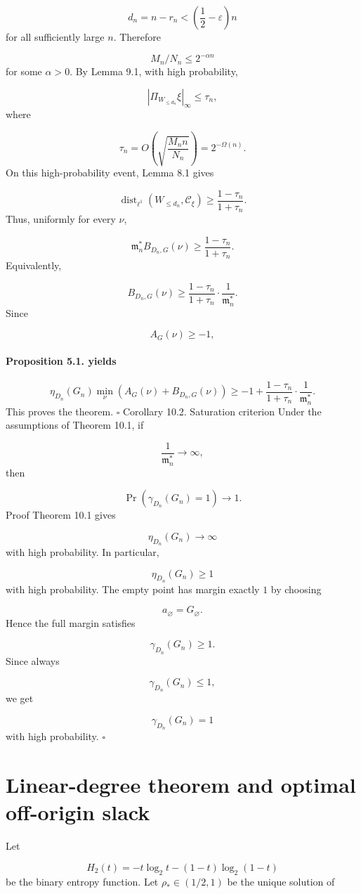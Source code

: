 \documentclass[11pt]{article}
\theoremstyle{definition}
\begin{document}
\[
d_n=n-r_n<
\left(\frac12-\varepsilon\right)n
\]
for all sufficiently large $n$. Therefore

\[
M_n/N_n\le2^{-\alpha n}
\]
for some $\alpha>0$. By Lemma 9.1, with high probability,

\[
|\Pi_{W_{\le d_n}}\xi|_\infty\le\tau_n,
\]
where

\[
\tau_n=O\left(\sqrt{\frac{M_nn}{N_n}}\right)=2^{-\Omega(n)}.
\]
On this high-probability event, Lemma 8.1 gives

\[
\operatorname{dist}_{\ell^1}(W_{\le d_n},\mathcal C_\xi)
\ge
\frac{1-\tau_n}{1+\tau_n}.
\]
Thus, uniformly for every $\nu$,

\[
\mathfrak m_n^*B_{D_n,G}(\nu)
\ge
\frac{1-\tau_n}{1+\tau_n}.
\]
Equivalently,

\[
B_{D_n,G}(\nu)
\ge
\frac{1-\tau_n}{1+\tau_n}\cdot\frac1{\mathfrak m_n^*}.
\]
Since

\[
A_G(\nu)\ge -1,
\]
\paragraph{Proposition 5.1. yields}
\[
\eta_{D_n}(G_n)
\min_\nu(A_G(\nu)+B_{D_n,G}(\nu))
\ge
-1+
\frac{1-\tau_n}{1+\tau_n}\cdot\frac1{\mathfrak m_n^*}.
\]
This proves the theorem. $\square$ Corollary 10.2. Saturation criterion Under the assumptions of Theorem 10.1, if

\[
\frac1{\mathfrak m_n^*}\to\infty,
\]
then

\[
\Pr(\gamma_{D_n}(G_n)=1)\to1.
\]
Proof Theorem 10.1 gives

\[
\eta_{D_n}(G_n)\to\infty
\]
with high probability. In particular,

\[
\eta_{D_n}(G_n)\ge1
\]
with high probability. The empty point has margin exactly $1$ by choosing

\[
a_\varnothing=G_\varnothing.
\]
Hence the full margin satisfies

\[
\gamma_{D_n}(G_n)\ge1.
\]
Since always

\[
\gamma_{D_n}(G_n)\le1,
\]
we get

\[
\gamma_{D_n}(G_n)=1
\]
with high probability. $\square$

\section{Linear-degree theorem and optimal off-origin slack}
Let

\[
H_2(t)=-t\log_2t-(1-t)\log_2(1-t)
\]
be the binary entropy function. Let $\rho_*\in(1/2,1)$ be the unique solution of
\end{document}
